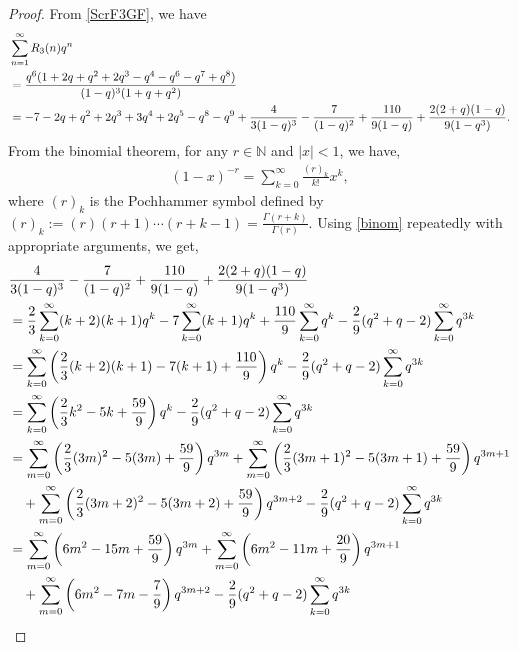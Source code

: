 \documentclass[10pt,a4paper]{amsart}
\begin{document}
	\begin{proof}
		From \eqref{ScrF3GF}, we have
		\begin{align}
			&\sum_{n=1}^{\infty} R_3(n) q^n \notag \\
			&= \frac{q^6(1+2q+q^2+2q^3-q^4-q^6-q^7+q^8)}{(1-q)^3(1+q+q^2)} \notag \\
			&= -7 -2q +q^2 +2q^3 +3q^4 +2q^5 -q^8 -q^9 +\frac{4}{3(1-q)^3}- \frac{7}{(1-q)^2} + \frac{110}{9 (1-q)} +  \frac{2(2+q)(1-q)}{9(1-q^3)}. \label{3inter}
		\end{align}		
		From the binomial theorem, for any $r \in \mathbb{N}$ and $|x|<1$, we have,
		\begin{align}
			(1-x)^{-r} = \sum_{k=0}^{\infty} \frac{(r)_k}{k!}x^k, \label{binom}
		\end{align}
		where $(r)_k$ is the Pochhammer symbol defined by $(r)_k:=(r)(r+1)\cdots (r+k-1)= \frac{\Gamma(r+k)}{\Gamma(r)}$.
		Using \eqref{binom} repeatedly with appropriate arguments, we get,
		\begin{align}
			&\frac{4}{3(1-q)^3}- \frac{7}{(1-q)^2} + \frac{110}{9 (1-q)} +  \frac{2(2+q)(1-q)}{9(1-q^3)} \notag \\
			&=\frac{2}{3} \sum_{k=0}^{\infty} (k+2)(k+1) q^k -  7\sum_{k=0}^{\infty}(k+1)q^k + \frac{110}{9} \sum_{k=0}^{\infty} q^k- \frac{2}{9} (q^2+q-2)  \sum_{k=0}^{\infty} q^{3k} \notag \\
			&= \sum_{k=0}^{\infty} \left( \frac{2}{3} (k+2)(k+1) -7(k+1) + \frac{110}{9} \right) q^k - \frac{2}{9} (q^2+q-2)  \sum_{k=0}^{\infty} q^{3k} \notag \\
			&= \sum_{k=0}^{\infty} \left( \frac{2}{3} k^2 -5k + \frac{59}{9} \right) q^k - \frac{2}{9} (q^2+q-2)  \sum_{k=0}^{\infty} q^{3k}\notag \\
			&= \sum_{m=0}^{\infty} \left( \frac{2}{3} (3m)^2 -5(3m) + \frac{59}{9} \right) q^{3m} +\sum_{m=0}^{\infty} \left( \frac{2}{3} (3m+1)^2 -5(3m+1) + \frac{59}{9} \right) q^{3m+1} \notag\\
			&\quad + \sum_{m=0}^{\infty} \left( \frac{2}{3} (3m+2)^2 -5(3m+2) + \frac{59}{9} \right) q^{3m+2} - \frac{2}{9} (q^2+q-2)  \sum_{k=0}^{\infty} q^{3k} \notag\\
			&= \sum_{m=0}^{\infty} \left( 6m^2 -15m + \frac{59}{9} \right) q^{3m} +\sum_{m=0}^{\infty} \left( 6m^2 -11m + \frac{20}{9} \right) q^{3m+1} \notag\\
			&\quad + \sum_{m=0}^{\infty} \left( 6m^2 -7m - \frac{7}{9} \right) q^{3m+2} - \frac{2}{9} (q^2+q-2)  \sum_{k=0}^{\infty} q^{3k}\notag \\

\end{align}
\end{proof}
\end{document}
